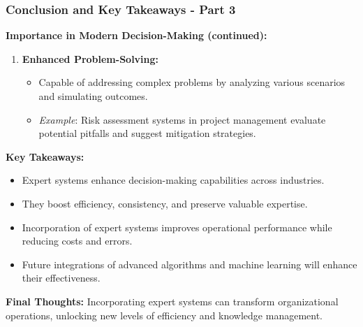 \documentclass[aspectratio=169]{beamer}
\begin{document}
\begin{frame}[fragile]
    \frametitle{Conclusion and Key Takeaways - Part 3}
    \textbf{Importance in Modern Decision-Making (continued):}

    \begin{enumerate}[resume]
        \item \textbf{Enhanced Problem-Solving:}
        \begin{itemize}
            \item Capable of addressing complex problems by analyzing various scenarios and simulating outcomes.
            \item \textit{Example}: Risk assessment systems in project management evaluate potential pitfalls and suggest mitigation strategies.
        \end{itemize}
    \end{enumerate}

    \textbf{Key Takeaways:}
    \begin{itemize}
        \item Expert systems enhance decision-making capabilities across industries.
        \item They boost efficiency, consistency, and preserve valuable expertise.
        \item Incorporation of expert systems improves operational performance while reducing costs and errors.
        \item Future integrations of advanced algorithms and machine learning will enhance their effectiveness.
    \end{itemize}

    \textbf{Final Thoughts:}
    Incorporating expert systems can transform organizational operations, unlocking new levels of efficiency and knowledge management.
\end{frame}
\end{document}
